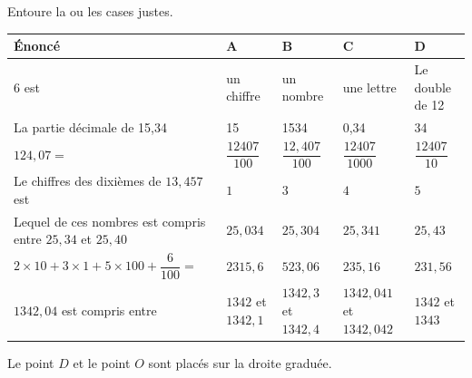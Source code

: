 \begin{pageAuto} 

\ExoAuto

Entoure la ou les cases justes.


\begin{tabularx}{\linewidth}{|p{6cm}|X|X|X|X|}
\hline 
Énoncé & A & B & C & D \\ 
\hline 
$6$ est  & un chiffre &  un nombre & une lettre & Le double de 12 \\ 
\hline 
La partie décimale de 15,34 & 15 & 1534 & 0,34 & 34 \\ 
\hline
$124,07=$ & $\dfrac{12407}{100}$ &  $\dfrac{12,407}{100}$ &  $\dfrac{12407}{1000}$ &  $\dfrac{12407}{10}$  \\ 
\hline 
Le chiffres des dixièmes de $13,457$ est  & $1$ & $3$ & $4$ & $5$ \\ 
\hline 
Lequel de ces nombres est compris entre $25,34$ et $25,40 $ & $25,034$ & $25,304$ & $25,341$ & $25,43$ \\ 
\hline 
 $2\times 10 +3\times 1+5\times 100 +\dfrac{6}{100}=$ & $2315,6$ &  $523,06$ &  $235,16$ &  $231,56$ \vspace{0.3cm} \\ 
\hline 
 $1342,04$ est compris entre & $1342$ et $1342,1$ &  $1342,3$ et  $1342,4$ & $1342,041$  et  $1342,042$&  $1342$ et $1343$ \\ 
\hline
\end{tabularx} 

\ExoAuto


 Le point $D$ et le point $O$ sont placés sur la droite graduée.
 



\end{pageAuto}
